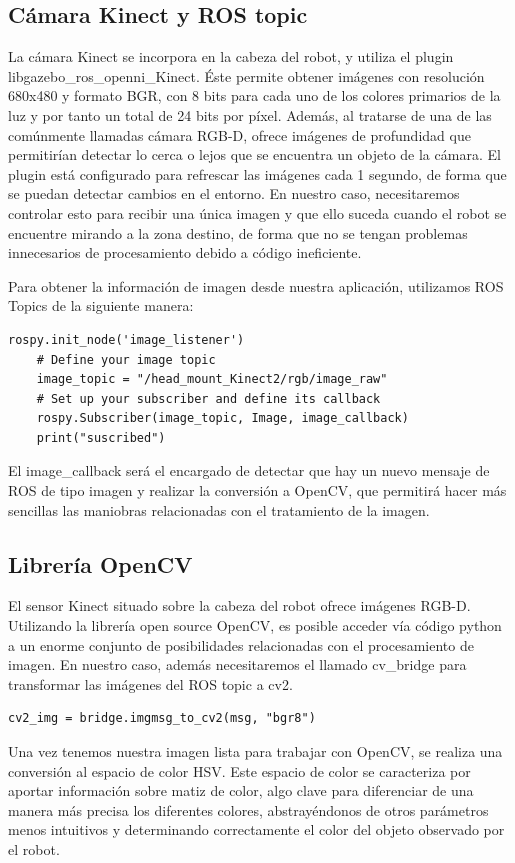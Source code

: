 \documentclass[12pt,spanish,chapterprefix, numbers=noenddot]{book}
\numberwithin{equation}{section}
\numberwithin{figure}{section}
\begin{document}
\subsection{Cámara Kinect y ROS topic} 
La cámara Kinect se incorpora en la cabeza del robot, y utiliza el plugin libgazebo\_ros\_openni\_Kinect. Éste permite obtener imágenes con resolución 680x480 y formato BGR, con 8 bits para cada uno de los colores primarios de la luz y por tanto un total de 24 bits por píxel. Además, al tratarse de una de las comúnmente llamadas cámara RGB-D, ofrece imágenes de profundidad que permitirían detectar lo cerca o lejos que se encuentra un objeto de la cámara. El plugin está configurado para refrescar las imágenes cada 1 segundo, de forma que se puedan detectar cambios en el entorno. En nuestro caso, necesitaremos controlar esto para recibir una única imagen y que ello suceda cuando el robot se encuentre mirando a la zona destino, de forma que no se tengan problemas innecesarios de procesamiento debido a código ineficiente.

Para obtener la información de imagen desde nuestra aplicación, utilizamos ROS Topics de la siguiente manera: 
\vspace{20pt}
	\begin{lstlisting}[frame=single]    
    rospy.init_node('image_listener')
    # Define your image topic
    image_topic = "/head_mount_Kinect2/rgb/image_raw"
    # Set up your subscriber and define its callback
    rospy.Subscriber(image_topic, Image, image_callback)
    print("suscribed")
	\end{lstlisting}

El image\_callback será el encargado de detectar que hay un nuevo mensaje de ROS de tipo imagen y realizar la conversión a OpenCV, que permitirá hacer más sencillas las maniobras relacionadas con el tratamiento de la imagen.
\subsection{Librería OpenCV} 
El sensor Kinect situado sobre la cabeza del robot ofrece imágenes RGB-D. Utilizando la librería open source OpenCV, es posible acceder vía código python a un enorme conjunto de posibilidades relacionadas con el procesamiento de imagen. 
En nuestro caso, además necesitaremos el llamado cv\_bridge para transformar las imágenes del ROS topic a cv2. 
\vspace{20pt}
	\begin{lstlisting}[frame=single]    
    cv2_img = bridge.imgmsg_to_cv2(msg, "bgr8")
	\end{lstlisting}
Una vez tenemos nuestra imagen lista para trabajar con OpenCV, se realiza una conversión al espacio de color HSV.
Este espacio de color se caracteriza por aportar información sobre matiz de color, algo clave para diferenciar de una manera más precisa los diferentes colores, abstrayéndonos de otros parámetros menos intuitivos y determinando correctamente el color del objeto observado por el robot. 
\end{document}

